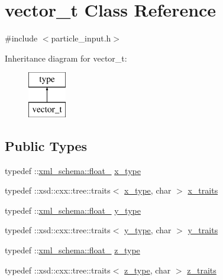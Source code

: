 \hypertarget{classvector__t}{}\section{vector\+\_\+t Class Reference}
\label{classvector__t}


{\ttfamily \#include $<$particle\+\_\+input.\+h$>$}

Inheritance diagram for vector\+\_\+t\+:\begin{figure}[H]
\begin{center}
\leavevmode
\includegraphics[height=2.000000cm]{classvector__t}
\end{center}
\end{figure}
\subsection*{Public Types}
\begin{DoxyCompactItemize}
\item 
typedef \+::\hyperlink{namespacexml__schema_ad7e04ab17bba0b3fdde43fb79ef6ed87}{xml\+\_\+schema\+::float\+\_\+} \hyperlink{classvector__t_a3e09c311dbbdc507b68a2f3fa0c3d25b}{x\+\_\+type}
\item 
typedef \+::xsd\+::cxx\+::tree\+::traits$<$ \hyperlink{classvector__t_a3e09c311dbbdc507b68a2f3fa0c3d25b}{x\+\_\+type}, char $>$ \hyperlink{classvector__t_ae5816c2392b8a96d1f1b44725329edef}{x\+\_\+traits}
\item 
typedef \+::\hyperlink{namespacexml__schema_ad7e04ab17bba0b3fdde43fb79ef6ed87}{xml\+\_\+schema\+::float\+\_\+} \hyperlink{classvector__t_ab24cc76c51c8a32d39f97d1b4f8ddc5c}{y\+\_\+type}
\item 
typedef \+::xsd\+::cxx\+::tree\+::traits$<$ \hyperlink{classvector__t_ab24cc76c51c8a32d39f97d1b4f8ddc5c}{y\+\_\+type}, char $>$ \hyperlink{classvector__t_a62b2a4701ddd5ad8548e19b50dbce8bb}{y\+\_\+traits}
\item 
typedef \+::\hyperlink{namespacexml__schema_ad7e04ab17bba0b3fdde43fb79ef6ed87}{xml\+\_\+schema\+::float\+\_\+} \hyperlink{classvector__t_a99f7b43996ec66480576ae8bd8d03cb6}{z\+\_\+type}
\item 
typedef \+::xsd\+::cxx\+::tree\+::traits$<$ \hyperlink{classvector__t_a99f7b43996ec66480576ae8bd8d03cb6}{z\+\_\+type}, char $>$ \hyperlink{classvector__t_a9ce39db28963631b425266d992cef7e3}{z\+\_\+traits}
\end{DoxyCompactItemize}
